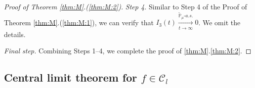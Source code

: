 \documentclass[12pt,a4paper]{amsart}
\theoremstyle{plain}
\theoremstyle{definition}
\numberwithin{equation}{section}
\begin{document}
\begin{proof}[Proof of Theorem \ref{thm:M}.(\ref{thm:M:2})]
  \emph{Step 4.}
 Similar to Step 4 of the Proof of Theorem \ref{thm:M}.(\ref{thm:M:1}), we can verify that $I_3(t) \xrightarrow[t\to \infty]{\widetilde {\mathbb P}_\mu \text{-} a.s.} 0$.
  We omit the details.

 	\emph{Final step.} Combining Steps 1--4, we complete the proof of \ref{thm:M}.\eqref{thm:M:2}.
\end{proof}

\subsection{Central limit theorem for $f\in \mathcal C_l$}
\label{sec: large rate clt}
\end{document}
